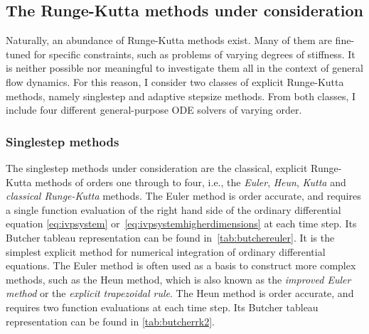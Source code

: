 \subsection{The Runge-Kutta methods under consideration}
\label{sub:the_runge_kutta_methods_under_consideration}

Naturally, an abundance of Runge-Kutta methods exist. Many of them are
fine-tuned for specific constraints, such as problems of varying degrees of
stiffness. It is neither possible nor meaningful to investigate them all
in the context of general flow dynamics. For this reason, I consider two classes
of explicit Runge-Kutta methods, namely singlestep and adaptive stepsize
methods. From both classes, I include four different general-purpose ODE solvers
of varying order.

\subsubsection{Singlestep methods}
\label{ssub:singlestep_methods}

The singlestep methods under consideration are the classical, explicit
Runge-Kutta methods of orders one through to four, i.e., the \emph{Euler},
\emph{Heun}, \emph{Kutta} and \emph{classical Runge-Kutta} methods. The
Euler method is  order accurate, and requires a single function
evaluation of the right hand side of the ordinary differential equation
\eqref{eq:ivpsystem} or~\eqref{eq:ivpsystemhigherdimensions} at each time step.
Its Butcher tableau representation can be found in~\cref{tab:butchereuler}.
It is the simplest explicit method for numerical integration of ordinary
differential equations. The Euler method is often used as a basis to construct
more complex methods, such as the Heun method, which is also known as the
\emph{improved Euler method} or the \emph{explicit trapezoidal rule}. The Heun
method is  order accurate, and requires two function evaluations at each
time step. Its Butcher tableau representation can be found in
\cref{tab:butcherrk2}.






